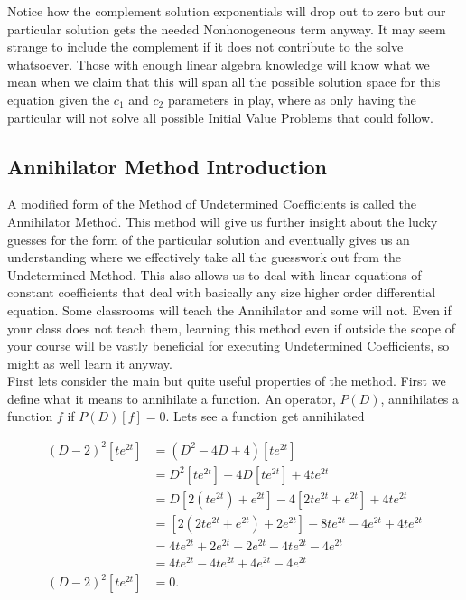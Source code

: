 \documentclass[12pt]{article}
\begin{document}
Notice how the complement solution exponentials will drop out to zero but our particular solution gets the needed Nonhonogeneous term anyway. It may seem strange to include the complement if it does not contribute to the solve whatsoever. Those with enough linear algebra knowledge will know what we mean when we claim that this will span all the possible solution space for this equation given the $c_1$ and $c_2$ parameters in play, where as only having the particular will not solve all possible Initial Value Problems that could follow.

\subsection{Annihilator Method Introduction}

A modified form of the Method of Undetermined Coefficients is called the Annihilator Method. This method will give us further insight about the lucky guesses for the form of the particular solution and eventually gives us an understanding where we effectively take all the guesswork out from the Undetermined Method. This also allows us to deal with linear equations of constant coefficients that deal with basically any size higher order differential equation. Some classrooms will teach the Annihilator and some will not. Even if your class does not teach them, learning this method even if outside the scope of your course will be vastly beneficial for executing Undetermined Coefficients, so might as well learn it anyway. \\
 
First lets consider the main but quite useful properties of the method. First we define what it means to annihilate a function. An operator, $P(D)$, annihilates a function $f$ if $P(D)[f]=0$. Lets see a function get annihilated
 
\begin{align*}
     (D-2)^2[te^{2t}]&=(D^2-4D+4)[te^{2t}] \\
     &= D^2[te^{2t}]-4D[te^{2t}]+4te^{2t} \\
     &= D[2(te^{2t})+e^{2t}]-4[2te^{2t}+e^{2t}]+4te^{2t} \\
     &= [2(2te^{2t}+e^{2t})+2e^{2t}]-8te^{2t}-4e^{2t}+4te^{2t} \\
     &= 4te^{2t}+2e^{2t}+2e^{2t}-4te^{2t}-4e^{2t} \\
     &= 4te^{2t}-4te^{2t}+4e^{2t}-4e^{2t} \\
     (D-2)^2[te^{2t}]&=0.
\end{align*}
 
\end{document}
